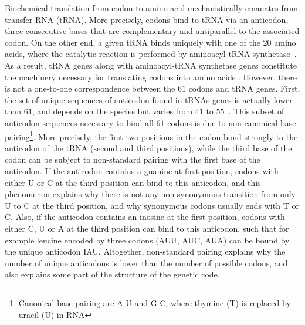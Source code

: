 Biochemical translation from \gls{codon} to amino acid mechanistically emanates from transfer \acrshort{RNA} (\acrshort{tRNA}).
More precisely, \glspl{codon} bind to \acrshort{tRNA} via an anticodon, three consecutive bases that are complementary and antiparallel to the associated \gls{codon}.
On the other end, a given \acrshort{tRNA} binds uniquely with one of the $20$ amino acids, where the catalytic reaction is performed by aminoacyl-tRNA synthetase~\citep{Rich1976}.
As a result, \acrshort{tRNA} genes along with aminoacyl-tRNA synthetase genes constitute the machinery necessary for translating \glspl{codon} into amino acids .
However, there is not a one-to-one correspondence between the $61$ \glspl{codon} and \acrshort{tRNA} genes.
First, the set of unique sequences of anticodon found in tRNAs genes is actually lower than $61$, and depends on the species but varies from $41$ to $55$~\citep{Goodenbour2006}.
This subset of anticodon sequences necessary to bind all $61$ \glspl{codon} is due to non-canonical base pairing\footnote{Canonical base pairing are A-U and G-C, where thymine (T) is replaced by uracil (U) in RNA}.
More precisely, the first two positions in the \gls{codon} bond strongly to the anticodon of the \acrshort{tRNA} (second and third positions), while the third base of the \gls{codon} can be subject to non-standard pairing with the first base of the anticodon.
If the anticodon contains a guanine at first position, \glspl{codon} with either U or C at the third position can bind to this anticodon, and this phenomenon explains why there is not any \gls{non-synonymous} transition from only U to C at the third position, and why \gls{synonymous} \glspl{codon} usually ends with T or C.
Also, if the anticodon contains an inosine at the first position, \glspl{codon} with either C, U or A at the third position can bind to this anticodon, such that for example leucine encoded by three \glspl{codon} (AUU, AUC, AUA) can be bound by the unique anticodon IAU.
Altogether, non-standard pairing explains why the number of unique anticodons is lower than the number of possible \glspl{codon}, and also explains some part of the structure of the genetic code.

